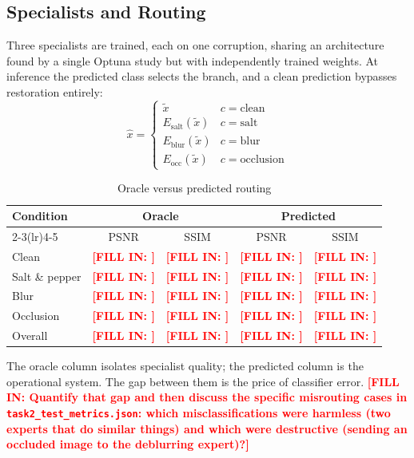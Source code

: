 \documentclass[conference]{IEEEtran}
\newcommand{\PLACEHOLDER}[1]{\textcolor{red}{\textbf{[FILL IN: #1]}}}
\begin{document}
\subsection{Specialists and Routing}
Three specialists are trained, each on one corruption, sharing an architecture
found by a single Optuna study but with independently trained weights. At
inference the predicted class selects the branch, and a clean prediction
bypasses restoration entirely:
\begin{equation}
\hat{x} = \begin{cases}
\tilde{x} & c = \text{clean}\\
E_{\text{salt}}(\tilde{x}) & c = \text{salt}\\
E_{\text{blur}}(\tilde{x}) & c = \text{blur}\\
E_{\text{occ}}(\tilde{x}) & c = \text{occlusion}
\end{cases}
\end{equation}

\begin{table}[t]
\caption{Oracle versus predicted routing}
\label{tab:task2routing}
\centering
\begin{tabular}{@{}lcccc@{}}
\toprule
\multirow{2}{*}{\textbf{Condition}} & \multicolumn{2}{c}{\textbf{Oracle}} &
\multicolumn{2}{c}{\textbf{Predicted}} \\
\cmidrule(lr){2-3}\cmidrule(lr){4-5}
 & PSNR & SSIM & PSNR & SSIM \\
\midrule
Clean & \PLACEHOLDER{} & \PLACEHOLDER{} & \PLACEHOLDER{} & \PLACEHOLDER{} \\
Salt \& pepper & \PLACEHOLDER{} & \PLACEHOLDER{} & \PLACEHOLDER{} & \PLACEHOLDER{} \\
Blur & \PLACEHOLDER{} & \PLACEHOLDER{} & \PLACEHOLDER{} & \PLACEHOLDER{} \\
Occlusion & \PLACEHOLDER{} & \PLACEHOLDER{} & \PLACEHOLDER{} & \PLACEHOLDER{} \\
\midrule
Overall & \PLACEHOLDER{} & \PLACEHOLDER{} & \PLACEHOLDER{} & \PLACEHOLDER{} \\
\bottomrule
\end{tabular}
\end{table}

The oracle column isolates specialist quality; the predicted column is the
operational system. The gap between them is the price of classifier error.
\PLACEHOLDER{Quantify that gap and then discuss the specific misrouting cases
in \texttt{task2\_test\_metrics.json}: which misclassifications were harmless
(two experts that do similar things) and which were destructive (sending an
occluded image to the deblurring expert)?}
\end{document}
